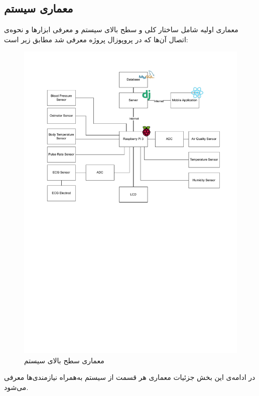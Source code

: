 \documentclass[12pt]{article}
\begin{document}
\newpage
\subsection{معماری سیستم}
معماری اولیه شامل ساختار کلی و سطح بالای سیستم و معرفی ابزارها و نحوه‌ی اتصال آن‌ها که در پروپوزال پروژه معرفی شد مطابق زیر است:
\begin{figure}[h]
	\begin{center}
		\includegraphics[width=.85\textwidth,trim={0 14cm 0 1cm},clip]{initial_arch} %
	\end{center}
	\caption{معماری سطح بالای سیستم}
\end{figure}

در ادامه‌ی این بخش جزئیات معماری هر قسمت از سیستم به‌همراه نیازمندی‌ها معرفی می‌شود.
\end{document}
